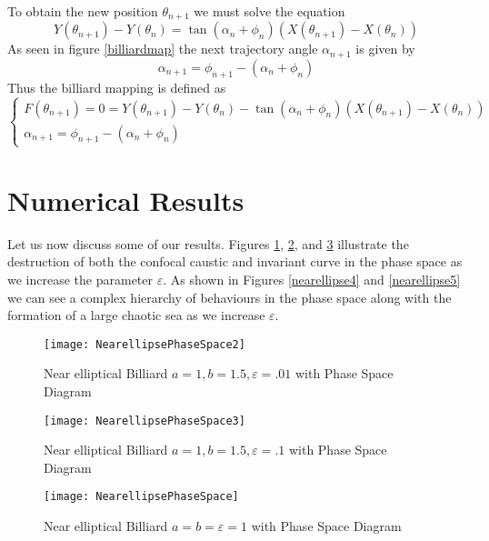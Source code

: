 To obtain the new position $\theta_{n+1}$ we must solve the equation
\begin{equation}
    Y(\theta_{n+1}) - Y(\theta_n) = \tan(\alpha_n + \phi_n)(X(\theta_{n+1}) - X(\theta_n))
\end{equation}
As seen in figure \ref{billiardmap} the next trajectory angle $\alpha_{n+1}$ is given by
\begin{equation}
    \alpha_{n+1} = \phi_{n+1} - (\alpha_n + \phi_n)
\end{equation}
Thus the billiard mapping is defined as
\begin{equation}
    \begin{cases} 
      F(\theta_{n+1}) = 0 = Y(\theta_{n+1}) - Y(\theta_n) - \tan(\alpha_n + \phi_n)(X(\theta_{n+1}) - X(\theta_n)) \\
      \alpha_{n+1} = \phi_{n+1} - (\alpha_n + \phi_n)
   \end{cases}
   \label{bmap}
\end{equation}

\section{Numerical Results}
Let us now discuss some of our results. Figures \ref{nearellipse1}, \ref{nearellipse2}, and \ref{nearellipse3} illustrate the destruction of both the confocal caustic and invariant curve in the phase space as we increase the parameter $\varepsilon$. As shown in Figures \ref{nearellipse4} and \ref{nearellipse5} we can see a complex hierarchy of behaviours in the phase space along with the formation of a large chaotic sea as we increase $\varepsilon$. 
\begin{figure}[h]
    \centering
    \texttt{[image: NearellipsePhaseSpace2]}
    \caption{Near elliptical Billiard $a=1, b=1.5, \varepsilon = .01$ with Phase Space Diagram}
    \label{nearellipse1}
\end{figure}
\begin{figure}[h]
    \centering
    \texttt{[image: NearellipsePhaseSpace3]}
    \caption{Near elliptical Billiard $a=1, b=1.5, \varepsilon = .1$ with Phase Space Diagram}
    \label{nearellipse2}
\end{figure}
\begin{figure}[h]
    \centering
    \texttt{[image: NearellipsePhaseSpace]}
    \caption{Near elliptical Billiard $a=b=\varepsilon = 1$ with Phase Space Diagram}
    \label{nearellipse3}
\end{figure}

